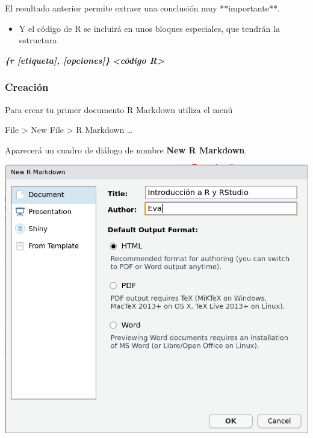 \documentclass[
  title=normal,
  notoc,
  bib=normal]{mnye}
\newenvironment{Shaded}{\begin{snugshade}}{\end{snugshade}}
\newcommand{\InformationTok}[1]{\textcolor[rgb]{0.56,0.35,0.01}{\textbf{\textit{#1}}}}
\newcommand{\NormalTok}[1]{#1}
\providecommand{\tightlist}{%
  \setlength{\itemsep}{0pt}\setlength{\parskip}{0pt}}
\begin{document}
\begin{Shaded}
\begin{Highlighting}[]
\NormalTok{El resultado anterior permite extraer una conclusión muy **importante**.}
\end{Highlighting}
\end{Shaded}

\begin{itemize}
\tightlist
\item
  Y el código de \textsf{R} se incluirá en unos bloques especiales, que tendrán la estructura
\end{itemize}

\begin{Shaded}
\begin{Highlighting}[]
\InformationTok{\textasciigrave{}\textasciigrave{}\textasciigrave{}\{r [etiqueta], [opciones]\}}
\InformationTok{\textless{}código R\textgreater{}}
\InformationTok{\textasciigrave{}\textasciigrave{}\textasciigrave{}}
\end{Highlighting}
\end{Shaded}

\hypertarget{creaciuxf3n}{%
\subsubsection{Creación}\label{creaciuxf3n}}

Para crear tu primer documento R Markdown utiliza el menú

\begin{menu}
File \textgreater{} New File \textgreater{} R Markdown \ldots{}

\end{menu}

Aparecerá un cuadro de diálogo de nombre \textbf{New R Markdown}.

\begin{center}\includegraphics[width=1\linewidth]{images/new-r-markdown} \end{center}
\end{document}
